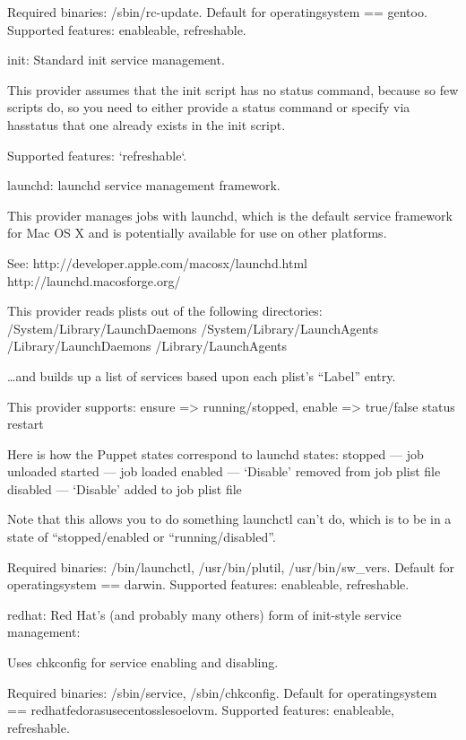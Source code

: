     Required binaries: /sbin/rc-update. Default for operatingsystem == gentoo. Supported features: enableable, refreshable.

    init: Standard init service management.

    This provider assumes that the init script has no status command, because so few scripts do, so you need to either provide a status command or specify via hasstatus that one already exists in the init script.

    Supported features: `refreshable`.

    launchd: launchd service management framework.

    This provider manages jobs with launchd, which is the default service framework for Mac OS X and is potentially available for use on other platforms.

    See:
        http://developer.apple.com/macosx/launchd.html
        http://launchd.macosforge.org/

    This provider reads plists out of the following directories:
        /System/Library/LaunchDaemons
        /System/Library/LaunchAgents
        /Library/LaunchDaemons
        /Library/LaunchAgents

    …and builds up a list of services based upon each plist’s “Label” entry.

    This provider supports:
        ensure => running/stopped,
        enable => true/false
        status
        restart

    Here is how the Puppet states correspond to launchd states:
        stopped — job unloaded
        started — job loaded
        enabled — ‘Disable’ removed from job plist file
        disabled — ‘Disable’ added to job plist file

    Note that this allows you to do something launchctl can’t do, which is to be in a state of “stopped/enabled or “running/disabled”.

    Required binaries: /bin/launchctl, /usr/bin/plutil, /usr/bin/sw_vers. Default for operatingsystem == darwin. Supported features: enableable, refreshable.

    redhat: Red Hat’s (and probably many others) form of init-style service management:

    Uses chkconfig for service enabling and disabling.

    Required binaries: /sbin/service, /sbin/chkconfig. Default for operatingsystem == redhatfedorasusecentosslesoelovm. Supported features: enableable, refreshable.

